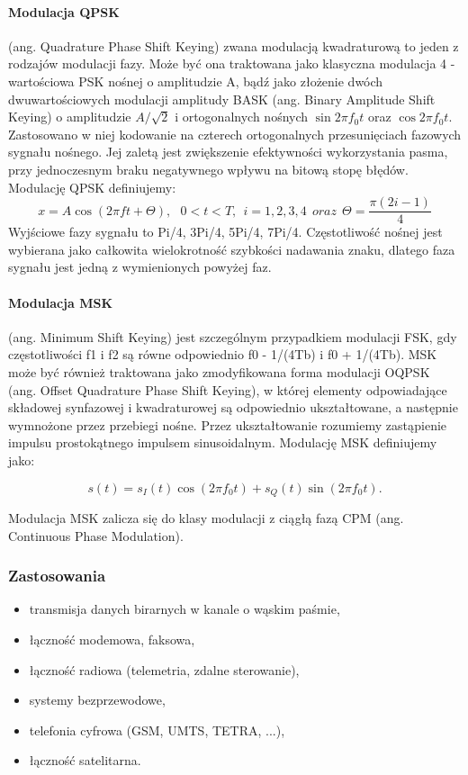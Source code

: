 \documentclass[a4paper,twoside]{report}
\begin{document}
\paragraph{Modulacja QPSK} (ang. Quadrature Phase Shift Keying) zwana modulacją kwadraturową to jeden z rodzajów modulacji fazy. Może być ona traktowana jako klasyczna modulacja 4 - wartościowa PSK nośnej o amplitudzie A, bądź jako złożenie dwóch dwuwartościowych modulacji amplitudy BASK (ang. Binary Amplitude Shift Keying) o amplitudzie $A/\sqrt{2}$  i ortogonalnych nośnych $\sin 2\pi f_{0}t $  oraz  $\cos 2\pi f_{0}t $. Zastosowano w niej kodowanie na czterech ortogonalnych przesunięciach fazowych sygnału nośnego. Jej zaletą jest zwiększenie efektywności wykorzystania pasma, przy jednoczesnym braku negatywnego wpływu na bitową stopę błędów. Modulację QPSK definiujemy:
\begin{equation}
x=A\cos(2\pi ft + \Theta), ~~~0<t<T,~~i=1,2,3,4~~oraz~~\Theta = \dfrac{\pi(2i-1)}{4}
\end{equation}
Wyjściowe fazy sygnału to Pi/4, 3Pi/4, 5Pi/4, 7Pi/4. Częstotliwość nośnej jest wybierana jako całkowita wielokrotność szybkości nadawania znaku, dlatego faza sygnału jest jedną z wymienionych powyżej faz.

\paragraph{Modulacja MSK}
 (ang. Minimum Shift Keying) jest szczególnym przypadkiem modulacji FSK, gdy częstotliwości f1 i f2 są równe odpowiednio f0 - 1/(4Tb) i f0 + 1/(4Tb). MSK może być również traktowana jako zmodyfikowana forma modulacji OQPSK (ang. Offset Quadrature Phase Shift Keying), w której elementy odpowiadające składowej synfazowej i kwadraturowej są odpowiednio ukształtowane, a następnie wymnożone przez przebiegi nośne. Przez ukształtowanie rozumiemy zastąpienie impulsu prostokątnego impulsem sinusoidalnym. Modulację MSK definiujemy jako:
 
\begin{equation}
s(t)=s_{I}(t)\cos (2\pi f_{0}t)+s_{Q}(t)\sin (2\pi f_{0}t).
\end{equation}

Modulacja MSK zalicza się do klasy modulacji z ciągłą fazą CPM (ang. Continuous Phase Modulation).


\subsubsection{Zastosowania}
\begin{itemize}
\item transmisja danych birarnych w kanale o wąskim paśmie,
\item łączność modemowa, faksowa,
\item łączność radiowa (telemetria, zdalne sterowanie),
\item systemy bezprzewodowe,
\item telefonia cyfrowa (GSM, UMTS, TETRA, ...),
\item łączność satelitarna.
\end{itemize}
\end{document}
